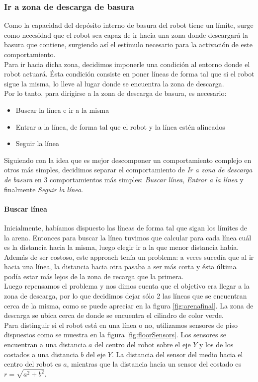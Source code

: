 \subsubsection{Ir a zona de descarga de basura}
\label{go_to_unload_zone}
Como la capacidad del dep\'osito interno de basura del robot tiene un l\'imite, 
surge como necesidad que el robot sea capaz de ir hacia una zona donde descargar\'a
la basura que contiene, surgiendo as\'i el est\'imulo necesario para la activaci\'on
de este comportamiento.
\\
Para ir hacia dicha zona, decidimos imponerle una condici\'on al
entorno donde el robot actuar\'a. \'Esta condici\'on consiste en poner l\'ineas
de forma tal que si el robot sigue la misma, lo lleve al lugar donde se
encuentra la zona de descarga.
\\
Por lo tanto, para dirigirse a la zona de descarga de basura, es necesario:
\begin{itemize}
	\item Buscar la l\'inea e ir a la misma
	\item Entrar a la l\'inea, de forma tal que el robot y la l\'inea est\'en alineados
	\item Seguir la l\'inea
\end{itemize}
Siguiendo con la idea que es mejor descomponer un comportamiento complejo en otros
m\'as simples, decidimos separar el comportamiento de \emph{Ir a zona de descarga de basura}
en 3 comportamientos m\'as simples: \emph{Buscar l\'inea}, \emph{Entrar a la l\'inea} y
finalmente \emph{Seguir la l\'inea}.

\paragraph{Buscar l\'inea}
\label{find_line}
Inicialmente, hab\'iamos dispuesto las l\'ineas de forma tal que sigan los l\'imites de la
arena. Entonces para buscar la l\'inea tuvimos que calcular para cada l\'inea
cu\'al es la distancia hacia la misma, luego elegir ir a la que menor distancia hab\'ia.
Adem\'as de ser costoso, este approach ten\'ia un problema: a veces suced\'ia que al ir hacia una
l\'inea, la distancia hacia otra pasaba a ser m\'as corta y \'esta \'ultima pod\'ia estar m\'as
lejos de la zona de recarga que la primera.
\\
Luego repensamos el problema y nos dimos cuenta que el objetivo era llegar a la zona de descarga,
por lo que decidimos dejar s\'olo 2 las l\'ineas que se encuentran cerca de la misma, como se
puede apreciar en la figura \ref{fig:arenafinal}. La zona de descarga se ubica cerca de donde
se encuentra el cilindro de color verde.
\\
Para distinguir si el robot est\'a en una l\'inea o no, utilizamos sensores de piso dispuestos
como se muestra en la figura \ref{fig:floorSensors}. Los sensores se encuentran a una distancia
$a$ del centro del robot sobre el eje $Y$ y los de los costados a una distancia $b$ del eje $Y$.
La distancia del sensor del medio hacia el centro del robot es $a$, mientras que la distancia
hacia un sensor del costado es $r = \sqrt{a^2 + b^2}$.

